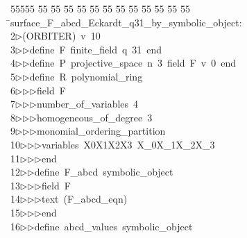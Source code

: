 %
%
\begin{tabbing}
55555 \= 55 \= 55 \= 55 \= 55 \= 55 \= 55 \= 55 \= 55 \= 55 \= 55 \= 55 \= 55 \= \>surface\_F\_abcd\_Eckardt\_q31\_by\_symbolic\_object:\\[0pt]
2\>$\triangleright$\>(ORBITER)\ v\ 10\ \\[0pt]
3\>$\triangleright$\>$\triangleright$\>define\ F\ finite\_field\ q\ 31\ end\ \\[0pt]
4\>$\triangleright$\>$\triangleright$\>define\ P\ projective\_space\ n\ 3\ field\ F\ v\ 0\ end\ \\[0pt]
5\>$\triangleright$\>$\triangleright$\>define\ R\ polynomial\_ring\ \\[0pt]
6\>$\triangleright$\>$\triangleright$\>$\triangleright$\>field\ F\ \\[0pt]
7\>$\triangleright$\>$\triangleright$\>$\triangleright$\>number\_of\_variables\ 4\ \\[0pt]
8\>$\triangleright$\>$\triangleright$\>$\triangleright$\>homogeneous\_of\_degree\ 3\ \\[0pt]
9\>$\triangleright$\>$\triangleright$\>$\triangleright$\>monomial\_ordering\_partition\ \\[0pt]
10\>$\triangleright$\>$\triangleright$\>$\triangleright$\>variables\ X0X1X2X3\ X\_0X\_1X\_2X\_3\ \\[0pt]
11\>$\triangleright$\>$\triangleright$\>$\triangleright$\>end\ \\[0pt]
12\>$\triangleright$\>$\triangleright$\>define\ F\_abcd\ symbolic\_object\ \\[0pt]
13\>$\triangleright$\>$\triangleright$\>$\triangleright$\>field\ F\ \\[0pt]
14\>$\triangleright$\>$\triangleright$\>$\triangleright$\>text\ (F\_abcd\_eqn)\ \\[0pt]
15\>$\triangleright$\>$\triangleright$\>$\triangleright$\>end\ \\[0pt]
16\>$\triangleright$\>$\triangleright$\>define\ abcd\_values\ symbolic\_object\ \\[0pt]

\end{tabbing}
